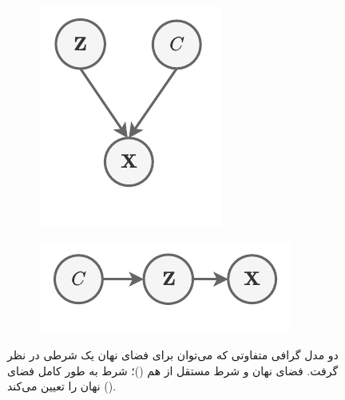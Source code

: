\begin{figure}[h]
    \centering
    \begin{subfigure}{0.1\textheight}
        \centering
        \includegraphics[width=1.\textwidth]{images/pgm_disentangle.pdf}
        \caption{}
        \label{fig:chap3:latent_pgm_d}
    \end{subfigure}
    \hspace{1cm}
    \begin{subfigure}{0.2\textheight}
        \centering
        \includegraphics[width=1.\textwidth]{images/pgm_hierarchical.pdf}
        \caption{}
        \label{fig:chap3:latent_pgm_h}
    \end{subfigure}
    \caption{
        دو مدل گرافی متفاوتی که می‌توان برای فضای نهان یک \task{} شرطی در نظر گرفت.
        فضای نهان و شرط مستقل از هم 
        ()؛
        شرط به طور کامل فضای نهان را تعیین می‌کند
        ().
    }
    \label{fig:chap3:latent_pgm}
\end{figure}

